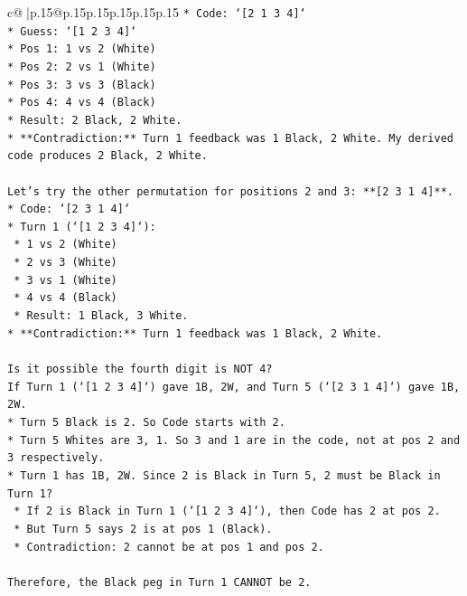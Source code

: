 \documentclass{article}
\begin{document}
{\begin{supertabular}{c@{$\;$}|p{.15\linewidth}@{}p{.15\linewidth}p{.15\linewidth}p{.15\linewidth}p{.15\linewidth}p{.15\linewidth}}
{{{\texttt{*   Code: `{[}2 1 3 4{]}`} \\
\texttt{*   Guess: `{[}1 2 3 4{]}`} \\
\texttt{*   Pos 1: 1 vs 2 (White)} \\
\texttt{*   Pos 2: 2 vs 1 (White)} \\
\texttt{*   Pos 3: 3 vs 3 (Black)} \\
\texttt{*   Pos 4: 4 vs 4 (Black)} \\
\texttt{*   Result: 2 Black, 2 White.} \\
\texttt{*   **Contradiction:** Turn 1 feedback was 1 Black, 2 White. My derived code produces 2 Black, 2 White.} \\
\\ 
\texttt{Let's try the other permutation for positions 2 and 3: **{[}2 3 1 4{]}**.} \\
\texttt{*   Code: `{[}2 3 1 4{]}`} \\
\texttt{*   Turn 1 (`{[}1 2 3 4{]}`):} \\
\texttt{    *   1 vs 2 (White)} \\
\texttt{    *   2 vs 3 (White)} \\
\texttt{    *   3 vs 1 (White)} \\
\texttt{    *   4 vs 4 (Black)} \\
\texttt{    *   Result: 1 Black, 3 White.} \\
\texttt{*   **Contradiction:** Turn 1 feedback was 1 Black, 2 White.} \\
\\ 
\texttt{Is it possible the fourth digit is NOT 4?} \\
\texttt{If Turn 1 (`{[}1 2 3 4{]}`) gave 1B, 2W, and Turn 5 (`{[}2 3 1 4{]}`) gave 1B, 2W.} \\
\texttt{*   Turn 5 Black is 2. So Code starts with 2.} \\
\texttt{*   Turn 5 Whites are 3, 1. So 3 and 1 are in the code, not at pos 2 and 3 respectively.} \\
\texttt{*   Turn 1 has 1B, 2W. Since 2 is Black in Turn 5, 2 must be Black in Turn 1?} \\
\texttt{    *   If 2 is Black in Turn 1 (`{[}1 2 3 4{]}`), then Code has 2 at pos 2.} \\
\texttt{    *   But Turn 5 says 2 is at pos 1 (Black).} \\
\texttt{    *   Contradiction: 2 cannot be at pos 1 and pos 2.} \\
\\ 
\texttt{Therefore, the Black peg in Turn 1 CANNOT be 2.} \\
}}}
\end{supertabular}}
\end{document}
